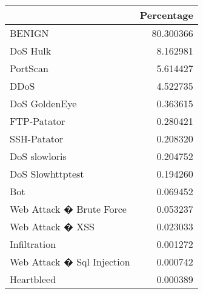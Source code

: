 \begin{tabular}{lr}
\toprule
{} & Percentage \\
\midrule
BENIGN                     &  80.300366 \\
DoS Hulk                   &   8.162981 \\
PortScan                   &   5.614427 \\
DDoS                       &   4.522735 \\
DoS GoldenEye              &   0.363615 \\
FTP-Patator                &   0.280421 \\
SSH-Patator                &   0.208320 \\
DoS slowloris              &   0.204752 \\
DoS Slowhttptest           &   0.194260 \\
Bot                        &   0.069452 \\
Web Attack � Brute Force   &   0.053237 \\
Web Attack � XSS           &   0.023033 \\
Infiltration               &   0.001272 \\
Web Attack � Sql Injection &   0.000742 \\
Heartbleed                 &   0.000389 \\
\bottomrule
\end{tabular}
